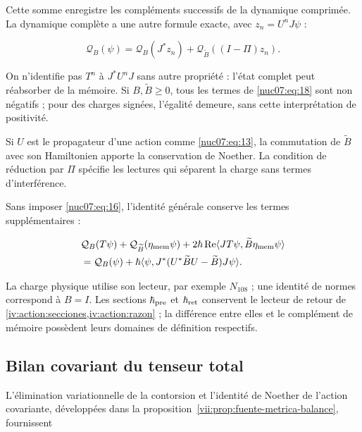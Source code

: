 Cette somme enregistre les compléments successifs de la dynamique comprimée. La dynamique complète a une autre formule exacte, avec \(z_n=U^nJ\psi\) :

\begin{equation}
\mathcal Q_B(\psi)=
\mathcal Q_B(J^*z_n)+
\mathcal Q_{\widetilde B}((I-\Pi)z_n).
\label{nuc07:eq:19}
\end{equation}

On n’identifie pas \(T^n\) à \(J^*U^nJ\) sans autre propriété : l’état complet peut réabsorber de la mémoire. Si \(B,\widetilde B\ge0\), tous les termes de \eqref{nuc07:eq:18} sont non négatifs ; pour des charges signées, l’égalité demeure, sans cette interprétation de positivité.

Si \(U\) est le propagateur d’une action comme \eqref{nuc07:eq:13}, la commutation de \(\widetilde B\) avec son Hamiltonien apporte la conservation de Noether. La condition de réduction par \(\Pi\) spécifie les lectures qui séparent la charge sans termes d’interférence.

Sans imposer \eqref{nuc07:eq:16}, l’identité générale conserve les termes supplémentaires :


\begin{equation}
\begin{aligned}
&\mathcal Q_B(T\psi)+\mathcal Q_{\widetilde B}(\eta_{\rm mem}\psi)
+2\hbar\operatorname{Re}
\langle JT\psi,\widetilde B\eta_{\rm mem}\psi\rangle\\
&=\mathcal Q_B(\psi)+
\hbar\langle\psi,J^*(U^*\widetilde BU-\widetilde B)J\psi\rangle.
\end{aligned}
\label{nuc07:eq:20}
\end{equation}

La charge physique utilise son lecteur, par exemple \(N_{108}\) ; une identité de normes correspond à \(B=I\). Les sections \(\hbar_{\rm pre}\) et \(\hbar_{\rm ret}\) conservent le lecteur de retour de \cref{iv:action:secciones,iv:action:razon} ; la différence entre elles et le complément de mémoire possèdent leurs domaines de définition respectifs.


\pagebreak %
\subsection{Bilan covariant du tenseur total}

L’élimination variationnelle de la contorsion et l’identité de Noether de l’action covariante, développées dans la proposition~\ref{vii:prop:fuente-metrica-balance}, fournissent

